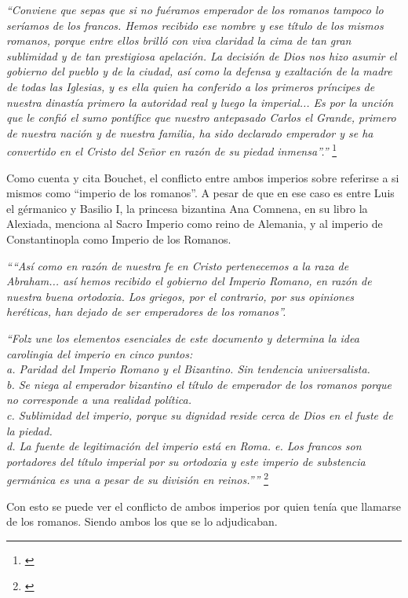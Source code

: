 \textit{``Conviene que sepas que si no fuéramos emperador de los
	romanos tampoco lo seríamos de los francos. Hemos recibido
	ese nombre y ese título de los mismos romanos, porque
	entre ellos brilló con viva claridad la cima de tan gran
	sublimidad y de tan prestigiosa apelación.
	La decisión de Dios nos hizo asumir el gobierno del pueblo
	y de la ciudad, así como la defensa y exaltación de la madre
	de todas las Iglesias, y es ella quien ha conferido a los
	primeros príncipes de nuestra dinastía primero la autoridad
	real y luego la imperial...
	Es por la unción que le confió el sumo pontífice que
	nuestro antepasado Carlos el Grande, primero de nuestra
	nación y de nuestra familia, ha sido declarado emperador
	y se ha convertido en el Cristo del Señor en razón
	de su piedad inmensa''.''}
\footnote{\cite[p.~846]{ciudad}}

Como cuenta y cita Bouchet, el conflicto entre ambos imperios
sobre referirse a si mismos como ``imperio de los romanos''.
A pesar de que en ese caso es entre Luis el gérmanico y
Basilio I, la princesa bizantina Ana Comnena, en su libro
la Alexiada, menciona al Sacro Imperio como reino de Alemania,
y al imperio de Constantinopla como Imperio de los Romanos.

\textit{
	````Así como en razón de nuestra fe en Cristo pertenecemos
	a la raza de Abraham... así hemos recibido el gobierno del
	Imperio Romano, en razón de nuestra buena ortodoxia.
	Los griegos, por el contrario, por sus opiniones heréticas,
	han dejado de ser emperadores de los romanos''.}

\textit{
	``Folz une los elementos esenciales de este documento
	y determina la idea carolingia del imperio
	en cinco puntos:\\
	a. Paridad del Imperio Romano y el Bizantino. Sin
	tendencia universalista.\\
	b. Se niega al emperador bizantino el título de emperador
	de los romanos porque no corresponde a una realidad política.\\
	c. Sublimidad del imperio, porque su dignidad reside cerca de
	Dios en el fuste de la piedad.\\
	d. La fuente de legitimación del imperio está en Roma.
	e. Los francos son portadores del título imperial por su
	ortodoxia y este imperio de substencia germánica es una a
	pesar de su división en reinos.''''}
\footnote{\cite[p.~846-847]{ciudad}}

Con esto se puede ver el conflicto de ambos imperios por
quien tenía que llamarse de los romanos. Siendo ambos los
que se lo adjudicaban.


















